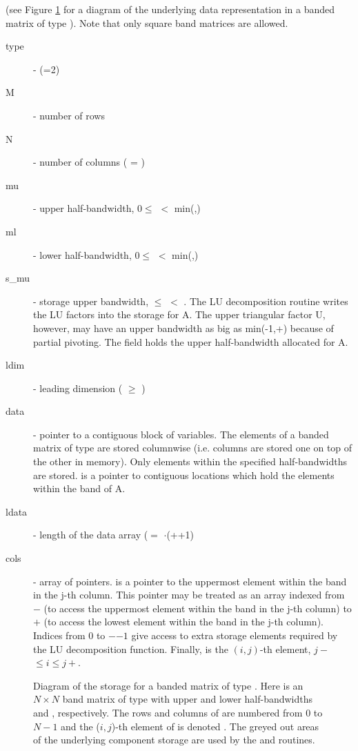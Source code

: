 (see Figure \ref{f:bandmat} for a diagram of the underlying data representation
in a banded matrix of type ). Note that only square band matrices are 
allowed.
\begin{description}
  \item[type]  -  (=2)
  \item[M]  - number of rows
  \item[N]  - number of columns ( = )
  \item[mu]    - upper half-bandwidth, $0 \le$  $<$ min(,)
  \item[ml]    - lower half-bandwidth, $0 \le$  $<$ min(,)
  \item[s\_mu]  - storage upper bandwidth,  $\le$  $<$ .
    The LU decomposition routine writes the LU factors into the storage 
    for A. The upper triangular factor U, however, may have 
    an upper bandwidth as big as min(-1,+) because of 
    partial pivoting. The  field holds the upper half-bandwidth allocated for A.
  \item[ldim]  - leading dimension ( $\ge$ )
  \item[data]  - pointer to a contiguous block of  variables.
    The elements of a banded matrix of type  are      
    stored columnwise (i.e. columns are stored one on top  
    of the other in memory). Only elements within the      
    specified half-bandwidths are stored.     
     is a pointer to  contiguous locations   
    which hold the elements within the band of A.  
  \item[ldata] - length of the data array ($=$ $\cdot$(++1)
  \item[cols]  - array of pointers.  is a pointer to the uppermost element 
    within the band  in the j-th column. This pointer may be treated as   
    an array indexed from $-$ (to access the uppermost element within the 
    band in the j-th column) to $+$ (to access the lowest element     
    within the band in the j-th column). Indices from $0$ to $-$$-1$ give 
    access to extra storage elements required by the LU decomposition function.
    Finally,  is the $(i,j)$-th element, $j-$ $\le i \le j+$. 
\end{description}
\begin{figure}
\centerline{}
\caption[Diagram of the storage for a banded matrix of type ]
  {Diagram of the storage for a banded matrix of type . Here  is an
  $N \times N$ band matrix of type  with upper and lower half-bandwidths 
  and , respectively. The rows and columns of  are numbered from $0$ to $N-1$
  and the ($i,j$)-th element of  is denoted . The greyed out areas of
  the underlying component storage are used by the  and
   routines.}\label{f:bandmat}
\end{figure}

